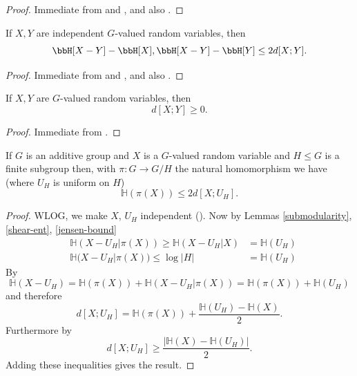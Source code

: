 \begin{proof} \leanok Immediate from  and , and also .
\end{proof}

\begin{lemma}\label{ruzsa-growth}
  \leanok
  If $X,Y$ are independent $G$-valued random variables, then
$$  \bbH[X-Y] - \bbH[X], \bbH[X-Y] - \bbH[Y] \leq 2d[X ;Y].$$
\end{lemma}

\begin{proof} \leanok Immediate from  and , and also .
\end{proof}

\begin{lemma}\label{ruzsa-nonneg}
  \leanok
  If $X,Y$ are $G$-valued random variables, then
  $$ d[X ;Y] \geq 0.$$
\end{lemma}

\begin{proof}
  \leanok
  Immediate from .
\end{proof}


\begin{lemma}\label{dist-projection}\leanok
If $G$ is an additive group and $X$ is a $G$-valued random variable and $H\leq G$ is a finite subgroup then, with $\pi:G\to G/H$ the natural homomorphism we have (where $U_H$ is uniform on $H$)
\[\mathbb{H}(\pi(X))\leq 2d[X;U_H].\]
\end{lemma}
\begin{proof}\leanok
WLOG, we make $X$, $U_H$ independent ().
Now by Lemmas \ref{submodularity}, \ref{shear-ent}, \ref{jensen-bound}
\begin{align*}
&\mathbb{H}(X-U_H|\pi(X)) \geq \mathbb{H}(X-U_H|X) &= \mathbb{H}(U_H) \\
&\mathbb{H}(X-U_H|\pi(X)) \leq \log |H| &= \mathbb{H}(U_H)
\end{align*}
By 
\[\mathbb{H}(X-U_H)=\mathbb{H}(\pi(X))+\mathbb{H}(X-U_H|\pi(X))=\mathbb{H}(\pi(X))+\mathbb{H}(U_H)\]
and therefore
\[d[X;U_H]=\mathbb{H}(\pi(X))+\frac{\mathbb{H}(U_H)-\mathbb{H}(X)}{2}.\]
Furthermore by 
\[d[X;U_H]\geq \frac{\lvert \mathbb{H}(X)-\mathbb{H}(U_H)\rvert}{2}.\]
Adding these inequalities gives the result.
\end{proof}

